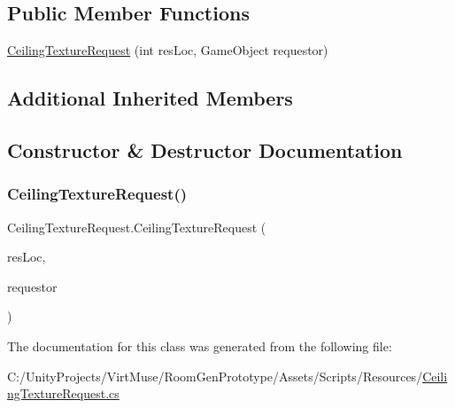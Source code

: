 \subsection*{Public Member Functions}
\begin{DoxyCompactItemize}
\item 
\mbox{\hyperlink{class_ceiling_texture_request_a2ebb0db894923df60855ca6cfdbed356}{Ceiling\+Texture\+Request}} (int res\+Loc, Game\+Object requestor)
\end{DoxyCompactItemize}
\subsection*{Additional Inherited Members}


\subsection{Constructor \& Destructor Documentation}
\mbox{\label{class_ceiling_texture_request_a2ebb0db894923df60855ca6cfdbed356}} 
\subsubsection{\texorpdfstring{Ceiling\+Texture\+Request()}{CeilingTextureRequest()}}
{\footnotesize\ttfamily Ceiling\+Texture\+Request.\+Ceiling\+Texture\+Request (\begin{DoxyParamCaption}\item[{int}]{res\+Loc,  }\item[{Game\+Object}]{requestor }\end{DoxyParamCaption})}



The documentation for this class was generated from the following file\+:\begin{DoxyCompactItemize}
\item 
C\+:/\+Unity\+Projects/\+Virt\+Muse/\+Room\+Gen\+Prototype/\+Assets/\+Scripts/\+Resources/\mbox{\hyperlink{_ceiling_texture_request_8cs}{Ceiling\+Texture\+Request.\+cs}}\end{DoxyCompactItemize}
